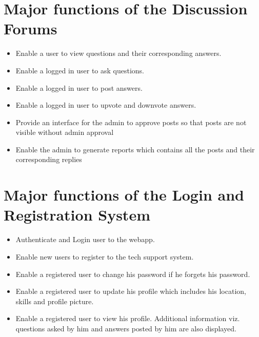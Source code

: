 \documentclass[letterpaper,10pt,english]{sphinxmanual}
\begin{document}
\section{Major functions of the Discussion Forums}
\label{functionalreq:major-functions-of-the-discussion-forums}\begin{itemize}
\item {} 
Enable a user to view questions and their corresponding answers.

\item {} 
Enable a logged in user to ask questions.

\item {} 
Enable a logged in user to post answers.

\item {} 
Enable a logged in user to upvote and downvote answers.

\item {} 
Provide an interface for the admin to approve posts so that posts are not visible without admin approval

\item {} 
Enable the admin to generate reports which contains all the posts and their corresponding replies

\end{itemize}


\section{Major functions of the Login and Registration System}
\label{functionalreq:major-functions-of-the-login-and-registration-system}\begin{itemize}
\item {} 
Authenticate and Login user to the webapp.

\item {} 
Enable new users to register to the tech support system.

\item {} 
Enable a registered user to change his password if he forgets his password.

\item {} 
Enable a registered user to update his profile which includes his location, skills and profile picture.

\item {} 
Enable a registered user to view his profile. Additional information viz. questions asked by him and answers posted by him are also displayed.

\end{itemize}
\end{document}
